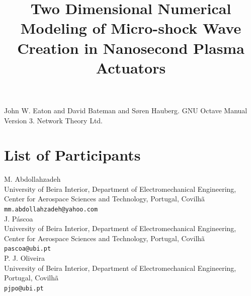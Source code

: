 \documentclass[article,A4,11pt]{llncs}%
\begin{document}

\begin{thebibliography}{10}
{\sc John W. Eaton and David Bateman and Søren Hauberg}. {GNU Octave Manual Version 3}. Network Theory Ltd.
\end{thebibliography}



\part{List of Participants}

\title{Two Dimensional Numerical Modeling of Micro-shock Wave Creation in Nanosecond Plasma Actuators}
 \author{} \institute{}
\maketitle
\begin{center}
{\large M. Abdollahzadeh}\\
University of Beira Interior, Department of Electromechanical Engineering, Center for Aerospace Sciences and Technology, Portugal, Covilhã\\
{\tt mm.abdollahzadeh@yahoo.com}
\\ \vspace{4mm}
{\large J. Páscoa}\\
University of Beira Interior, Department of Electromechanical Engineering, Center for Aerospace Sciences and Technology, Portugal, Covilhã\\
{\tt pascoa@ubi.pt}
\\ \vspace{4mm}
{\large P. J. Oliveira}\\
University of Beira Interior, Department of Electromechanical Engineering, Portugal, Covilhã\\
{\tt pjpo@ubi.pt}
\end{center}
\end{document}
